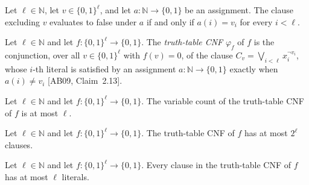 \begin{theorem}
\label{Complexity.falsifyingClause_eval_false}
\leanok
{}
Let $\ell\in\mathbb{N}$, let $v\in\{0,1\}^{\ell}$, and let $a:\mathbb{N}\to\{0,1\}$ be
an assignment. The clause excluding $v$ evaluates to false under $a$ if and only if
$a(i)=v_i$ for every $i<\ell$.
\end{theorem}

\begin{definition}
\label{Complexity.falsifyingCNF}
\leanok
{}
Let $\ell \in \mathbb{N}$ and let $f : \{0,1\}^\ell \to \{0,1\}$. The
\emph{truth-table CNF} $\varphi_f$ of $f$ is the conjunction, over all
$v \in \{0,1\}^\ell$ with $f(v) = 0$, of the clause
$C_v = \bigvee_{i<\ell} x_i^{\neg v_i}$, whose $i$-th literal is satisfied by an
assignment $a : \mathbb{N} \to \{0,1\}$ exactly when $a(i) \ne v_i$
[AB09, Claim~2.13].
\end{definition}

\begin{theorem}
\label{Complexity.falsifyingCNF_numVars}
\leanok
{}
Let $\ell\in\mathbb{N}$ and let $f:\{0,1\}^{\ell}\to\{0,1\}$. The variable count of the
truth-table CNF of $f$ is at most $\ell$.
\end{theorem}

\begin{theorem}
\label{Complexity.falsifyingCNF_length}
\leanok
{}
Let $\ell\in\mathbb{N}$ and let $f:\{0,1\}^{\ell}\to\{0,1\}$. The truth-table CNF of $f$
has at most $2^{\ell}$ clauses.
\end{theorem}

\begin{theorem}
\label{Complexity.falsifyingCNF_width}
\leanok
{}
Let $\ell\in\mathbb{N}$ and let $f:\{0,1\}^{\ell}\to\{0,1\}$. Every clause in the
truth-table CNF of $f$ has at most $\ell$ literals.
\end{theorem}

